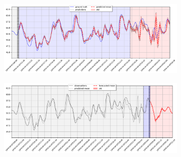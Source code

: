 \documentclass{article}
\begin{document}
\begin{figure}
  \centering
  \begin{subfigure}{0.5\textwidth}
    \centering
    \includegraphics[scale=0.17]{figures/trainCO2_biLSTM_ep120_hs128_nl3_ws12_g2_ph3}
    \caption{}
    \label{fig:fa}
  \end{subfigure}%
  \begin{subfigure}{0.5\textwidth}
    \centering
    \includegraphics[scale=0.17]{figures/forecastCO2_biLSTM_ep120_hs128_nl3_ws12_g2_ph3}
    \caption{}
    \label{fig:fb}
  \end{subfigure}
  \vspace{3mm}


\end{figure}
\end{document}
